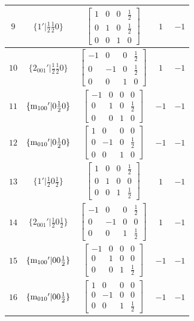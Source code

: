 \documentclass[fleqn,8pt]{jsarticle}
\begin{document}
\begin{longtable}{ccccc}
$ 9 $ & $ \{1{}'|\frac{1}{2} \frac{1}{2} 0\} $ & $ \begin{bmatrix} 1 & 0 & 0 & \frac{1}{2} \\ 0 & 1 & 0 & \frac{1}{2} \\ 0 & 0 & 1 & 0 \end{bmatrix} $ & $ 1 $ & $ -1 $ \\ \hline
$ 10 $ & $ \{2{}_{001}{}'|\frac{1}{2} \frac{1}{2} 0\} $ & $ \begin{bmatrix} -1 & 0 & 0 & \frac{1}{2} \\ 0 & -1 & 0 & \frac{1}{2} \\ 0 & 0 & 1 & 0 \end{bmatrix} $ & $ 1 $ & $ -1 $ \\ \hline
$ 11 $ & $ \{{\rm m}_{100}{}'|0 \frac{1}{2} 0\} $ & $ \begin{bmatrix} -1 & 0 & 0 & 0 \\ 0 & 1 & 0 & \frac{1}{2} \\ 0 & 0 & 1 & 0 \end{bmatrix} $ & $ -1 $ & $ -1 $ \\ \hline
$ 12 $ & $ \{{\rm m}_{010}{}'|0 \frac{1}{2} 0\} $ & $ \begin{bmatrix} 1 & 0 & 0 & 0 \\ 0 & -1 & 0 & \frac{1}{2} \\ 0 & 0 & 1 & 0 \end{bmatrix} $ & $ -1 $ & $ -1 $ \\ \hline
$ 13 $ & $ \{1{}'|\frac{1}{2} 0 \frac{1}{2}\} $ & $ \begin{bmatrix} 1 & 0 & 0 & \frac{1}{2} \\ 0 & 1 & 0 & 0 \\ 0 & 0 & 1 & \frac{1}{2} \end{bmatrix} $ & $ 1 $ & $ -1 $ \\ \hline
$ 14 $ & $ \{2{}_{001}{}'|\frac{1}{2} 0 \frac{1}{2}\} $ & $ \begin{bmatrix} -1 & 0 & 0 & \frac{1}{2} \\ 0 & -1 & 0 & 0 \\ 0 & 0 & 1 & \frac{1}{2} \end{bmatrix} $ & $ 1 $ & $ -1 $ \\ \hline
$ 15 $ & $ \{{\rm m}_{100}{}'|0 0 \frac{1}{2}\} $ & $ \begin{bmatrix} -1 & 0 & 0 & 0 \\ 0 & 1 & 0 & 0 \\ 0 & 0 & 1 & \frac{1}{2} \end{bmatrix} $ & $ -1 $ & $ -1 $ \\ \hline
$ 16 $ & $ \{{\rm m}_{010}{}'|0 0 \frac{1}{2}\} $ & $ \begin{bmatrix} 1 & 0 & 0 & 0 \\ 0 & -1 & 0 & 0 \\ 0 & 0 & 1 & \frac{1}{2} \end{bmatrix} $ & $ -1 $ & $ -1 $ \\
\end{longtable}
\end{document}
